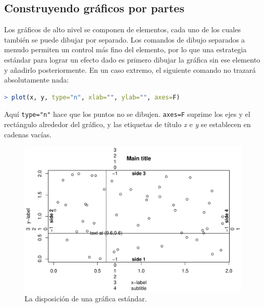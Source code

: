 \subsection{Construyendo gráficos por partes}

Los gráficos de alto nivel se componen de elementos, cada uno de los cuales
también se puede dibujar por separado. Los comandos de dibujo separados a menudo
permiten un control más fino del elemento, por lo que una estrategia estándar
para lograr un efecto dado es primero dibujar la gráfica sin ese elemento y
añadirlo posteriormente. En un caso extremo, el siguiente comando no trazará
absolutamente nada:

\begin{lstlisting}[language=R]
> plot(x, y, type="n", xlab="", ylab="", axes=F)
\end{lstlisting}

Aquí \texttt{type="n"} hace que los puntos no se dibujen. \texttt{axes=F}
suprime los ejes y el rectángulo alrededor del gráfico, y las etiquetas de
título \textit{x} e \textit{y} se establecen en cadenas vacías.

\begin{figure}[H]
  \includegraphics[width=\linewidth]{img/fig-5.pdf}
  \caption{La disposición de una gráfica estándar.}
  \label{fig-5}
\end{figure}


